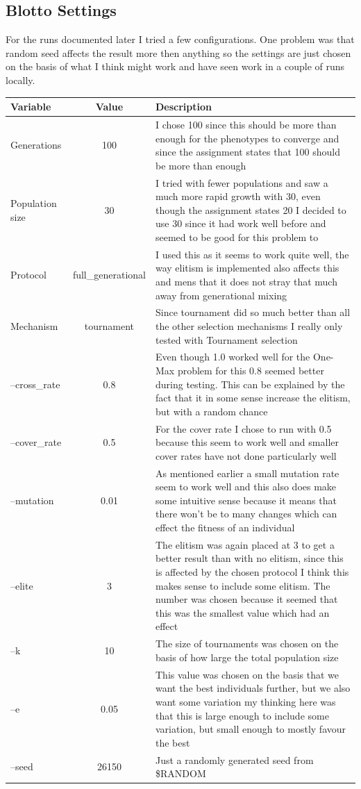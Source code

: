 \subsection{Blotto Settings}\label{sec:blotto settings}
For the runs documented later I tried a few configurations. One problem was that
random seed affects the result more then anything so the settings are just
chosen on the basis of what I think might work and have seen work in a couple of
runs locally.

\begin{tabular}{| l | c | p{7cm}|}
	\hline
	Variable & Value & Description \\
	\hline
	\hline
	Generations & 100 & I chose 100 since this should be more than enough
	for the phenotypes to converge and since the assignment states that 100
	should be more than enough \\
	\hline
	Population size & 30 & I tried with fewer populations and saw a much more
	rapid growth with 30, even though the assignment states 20 I decided to
	use 30 since it had work well before and seemed to be good for this
	problem to \\
	\hline
	Protocol & full\_generational & I used this as it seems to work quite
	well, the way elitism is implemented also affects this and mens that it
	does not stray that much away from generational mixing \\
	\hline
	Mechanism & tournament & Since tournament did so much better than all
	the other selection mechanisms I really only tested with Tournament
	selection \\
	\hline
	--cross\_rate & 0.8 & Even though 1.0 worked well for the One-Max
	problem for this 0.8 seemed better during testing. This can be explained
	by the fact that it in some sense increase the elitism, but with a
	random chance \\
	\hline
	--cover\_rate & 0.5 & For the cover rate I chose to run with 0.5 because
	this seem to work well and smaller cover rates have not done
	particularly well \\
	\hline
	--mutation & 0.01 & As mentioned earlier a small mutation rate seem to
	work well and this also does make some intuitive sense because it means
	that there won't be to many changes which can effect the fitness of an
	individual \\
	\hline
	--elite & 3 & The elitism was again placed at 3 to get a better result
	than with no elitism, since this is affected by the chosen protocol I
	think this makes sense to include some elitism. The number was chosen
	because it seemed that this was the smallest value which had an effect
	\\
	\hline
	--k & 10 & The size of tournaments was chosen on the basis of how large
	the total population size \\
	\hline
	--e & 0.05 & This value was chosen on the basis that we want the best
	individuals further, but we also want some variation my thinking here
	was that this is large enough to include some variation, but small
	enough to mostly favour the best \\
	\hline
	--seed & 26150 & Just a randomly generated seed from \$RANDOM \\
	\hline
\end{tabular}

